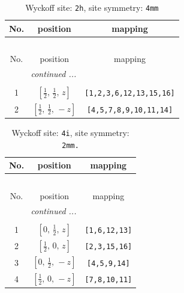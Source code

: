 \documentclass[fleqn,8pt]{jsarticle}
\begin{document}
\begin{longtable}{ccc}
\caption{Wyckoff site: {\tt 2h}, site symmetry: {\tt 4mm}}
 \\
 \hline \hline
No. & position & mapping \\ \hline \endfirsthead

\multicolumn{2}{l}{\tablename\ \thetable{}} \\
 \hline \hline
No. & position & mapping \\ \hline \endhead

 \hline \hline
\multicolumn{2}{r}{\footnotesize\it continued ...} \\ \endfoot

 \hline \hline
\multicolumn{2}{r}{} \\ \endlastfoot

1 & $\left[ \frac{1}{2},\, \frac{1}{2},\, z \right]$ & {\tt [1,2,3,6,12,13,15,16]} \\ \hline
2 & $\left[ \frac{1}{2},\, \frac{1}{2},\, - z \right]$ & {\tt [4,5,7,8,9,10,11,14]} \\
\end{longtable}
\renewcommand{\arraystretch}{1.2}
\begin{longtable}{ccc}
\caption{Wyckoff site: {\tt 4i}, site symmetry: {\tt 2mm.}}
 \\
 \hline \hline
No. & position & mapping \\ \hline \endfirsthead

\multicolumn{2}{l}{\tablename\ \thetable{}} \\
 \hline \hline
No. & position & mapping \\ \hline \endhead

 \hline \hline
\multicolumn{2}{r}{\footnotesize\it continued ...} \\ \endfoot

 \hline \hline
\multicolumn{2}{r}{} \\ \endlastfoot

1 & $\left[ 0,\, \frac{1}{2},\, z \right]$ & {\tt [1,6,12,13]} \\ \hline
2 & $\left[ \frac{1}{2},\, 0,\, z \right]$ & {\tt [2,3,15,16]} \\ \hline
3 & $\left[ 0,\, \frac{1}{2},\, - z \right]$ & {\tt [4,5,9,14]} \\ \hline
4 & $\left[ \frac{1}{2},\, 0,\, - z \right]$ & {\tt [7,8,10,11]} \\
\end{longtable}
\renewcommand{\arraystretch}{1.2}
\end{document}

